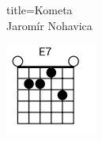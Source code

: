 \begin{song}{title=\predtitle\centering Kometa \\\large Jaromír Nohavica \vspace*{-0.3cm}}
{\begin{centerjustified}
\begin{varwidth}[t]{0.5\textwidth}
\includegraphics[width = 3cm]{../Akordy/e7.png}

\end{varwidth}

\end{centerjustified}
}
\setcounter{Slokočet}{0}
\end{song}
